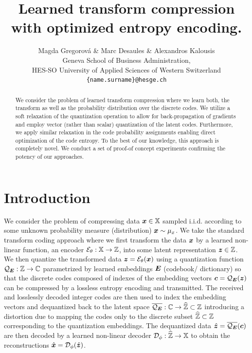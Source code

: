 \documentclass{article} %
\title{Learned transform compression with optimized entropy encoding.}
\author{Magda Gregorov\'a \& Marc Desaules \& Alexandros Kalousis \\
Geneva School of Business Administration, \\
HES-SO University of Applied Sciences of Western Switzerland \\
\texttt{\{name.surname\}@hesge.ch} \\
}
\newcommand{\mux}{\mu_x}
\newcommand{\gEt}{\gE_\theta}
\newcommand{\gQE}{\gQ_\mE}
\newcommand{\gDp}{\gD_\phi}
\newcommand{\vzh}{\hat{\vz}}
\newcommand{\vxh}{\hat{\vx}}
\begin{document}
\maketitle

\begin{abstract}
We consider the problem of learned transform compression where we learn both, the transform as well as the probability distribution over the discrete codes.
We utilize a soft relaxation of the quantization operation to allow for back-propagation of gradients and employ vector (rather than scalar) quantization of the latent codes.
Furthermore, we apply similar relaxation in the code probability assignments enabling direct optimization of the code entropy.
To the best of our knowledge, this approach is completely novel.
We conduct a set of proof-of concept experiments confirming the potency of our approaches.
\end{abstract}

\section{Introduction}\label{sec:Intro}

We consider the problem of compressing data ${\bm{x}} \in {\mathbb{X}}$ sampled i.i.d. according to some unknown probability measure (distribution) $\vx \sim \mux$.
We take the standard transform coding \citep{sayoodIntroductionDataCompression2012} approach where we first transform the data ${\bm{x}}$ by a learned non-linear function, an encoder $\gEt : \sX \to \sZ$, into some latent representation ${\bm{z}} \in {\mathbb{Z}}$.
We then quantize the transformed data $\vz = \gEt(\vx)$ using a quantization function $\gQE : \sZ \to \sC$ parametrized by learned embeddings ${\bm{E}}$ (codebook/ dictionary) so that the discrete codes composed of indexes of the embedding vectors $\vc = \gQE(\vz)$ can be compressed by a lossless entropy encoding and transmitted.
The received and losslessly decoded integer codes are then used to index the embedding vectors and dequantized back to the latent space $\overline{\gQE} : \sC \to \widehat{\sZ} \subset \sZ$ introducing a distortion due to mapping the codes only to the discrete subset $\widehat{{\mathbb{Z}}} \subset {\mathbb{Z}}$ corresponding to the quantization embeddings.
The dequantized data $\vzh = \overline{\gQE}(\vc)$ are then decoded by a learned non-linear decoder $\gDp : \widehat{\sZ} \to \sX$ to obtain the reconstructions $\vxh = \gDp(\vzh)$.
\end{document}
